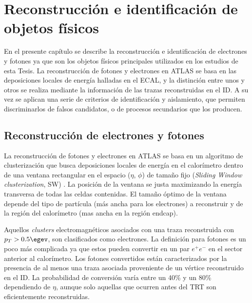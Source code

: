 \chapter{Reconstrucción e identificación de objetos físicos}



En el presente capítulo se describe la reconstrucción e identificación de electrones y fotones ya que son los objetos físicos principales utilizados en los estudios de esta Tesis. La reconstrucción de fotones y electrones en ATLAS se basa en las deposiciones locales de energía halladas en el ECAL, y la distinción entre unos y otros se   realiza mediante la información de las trazas reconstruidas en el ID. A su vez se aplican una serie de criterios de identificación y aislamiento, que permiten discriminarlos de falsos candidatos, o de procesos secundarios que los producen.

\section{Reconstrucción de electrones y fotones}

La  reconstrucción de fotones y electrones en ATLAS se basa en un algoritmo de clusterización \cite{Lampl:1099735} que busca deposiciones locales de energía en el calorímetro dentro de una ventana rectangular en el espacio ($\eta$, $\phi$) de tamaño fijo (\textit{Sliding Window clusterization}, SW) . La posición de la ventana se  justa maximizando la energía transversa de todas las celdas contenidas. El tamaño óptimo de la ventana depende del tipo de partícula (más ancha para los electrones) a reconstruir y de la región del calorímetro (mas ancha en la región endcap). 

Aquellos \textit{clusters} electromagnéticos asociados con una traza reconstruida con $p_{T} > 0.5 \egev$, son clasificados como electrones. La definición para fotones es un poco más complicada ya que estos pueden convertir en un par $e^{+}e^{-}$ en el sector anterior al calorímetro. Los fotones convertidos están caracterizados por la presencia de al menos una traza asociada proveniente de un vértice reconstruido en el ID. La probabilidad de conversión varía entre un 40\% y un 80\% dependiendo de $\eta$, aunque solo aquellas que ocurren antes del TRT son eficientemente reconstruidas. 


